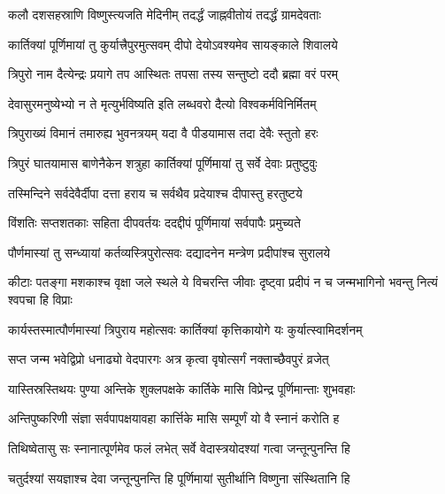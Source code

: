 \twolineshloka
{कलौ दशसहस्राणि विष्णुस्त्यजति मेदिनीम्}
{तदर्द्धं जाह्नवीतोयं तदर्द्धं ग्रामदेवताः} %

\twolineshloka
{कार्तिक्यां पूर्णिमायां तु कुर्यात्त्रैपुरमुत्सवम्}
{दीपो देयोऽवश्यमेव सायङ्काले शिवालये} %

\twolineshloka
{त्रिपुरो नाम दैत्येन्द्रः प्रयागे तप आस्थितः}
{तपसा तस्य सन्तुष्टो ददौ ब्रह्मा वरं परम्} %

\twolineshloka
{देवासुरमनुष्येभ्यो न ते मृत्युर्भविष्यति}
{इति लब्धवरो दैत्यो विश्वकर्मविनिर्मितम्} %

\twolineshloka
{त्रिपुराख्यं विमानं तमारुह्य भुवनत्रयम्}
{यदा वै पीडयामास तदा देवैः स्तुतो हरः} %

\twolineshloka
{त्रिपुरं घातयामास बाणेनैकेन शत्रुहा}
{कार्तिक्यां पूर्णिमायां तु सर्वे देवाः प्रतुष्टुवुः} %

\twolineshloka
{तस्मिन्दिने सर्वदेवैर्दीपा दत्ता हराय च}
{सर्वथैव प्रदेयाश्च दीपास्तु हरतुष्टये} %

\twolineshloka
{विंशतिः सप्तशतकाः सहिता दीपवर्तयः}
{ददद्दीपं पूर्णिमायां सर्वपापैः प्रमुच्यते} %

\twolineshloka
{पौर्णमास्यां तु सन्ध्यायां कर्तव्यस्त्रिपुरोत्सवः}
{दद्यादनेन मन्त्रेण प्रदीपांश्च सुरालये} %

\twolineshloka
{कीटाः पतङ्गा मशकाश्च वृक्षा जले स्थले ये विचरन्ति जीवाः}
{दृष्ट्वा प्रदीपं न च जन्मभागिनो भवन्तु नित्यं श्वपचा हि विप्राः} %

\twolineshloka
{कार्यस्तस्मात्पौर्णमास्यां त्रिपुराय महोत्सवः}
{कार्तिक्यां कृत्तिकायोगे यः कुर्यात्स्वामिदर्शनम्} %

\twolineshloka
{सप्त जन्म भवेद्विप्रो धनाढ्यो वेदपारगः}
{अत्र कृत्वा वृषोत्सर्गं नक्ताच्छैवपुरं व्रजेत्} %





\twolineshloka
{यास्तिस्रस्तिथयः पुण्या अन्तिके शुक्लपक्षके}
{कार्तिके मासि विप्रेन्द्र पूर्णिमान्ताः शुभवहाः} %

\twolineshloka
{अन्तिपुष्करिणी संज्ञा सर्वपापक्षयावहा}
{कार्त्तिके मासि सम्पूर्णं यो वै स्नानं करोति ह} %

\twolineshloka
{तिथिष्वेतासु सः स्नानात्पूर्णमेव फलं लभेत्}
{सर्वे वेदास्त्रयोदश्यां गत्वा जन्तून्पुनन्ति हि} %

\twolineshloka
{चतुर्दश्यां सयज्ञाश्च देवा जन्तून्पुनन्ति हि}
{पूर्णिमायां सुतीर्थानि विष्णुना संस्थितानि हि} %

